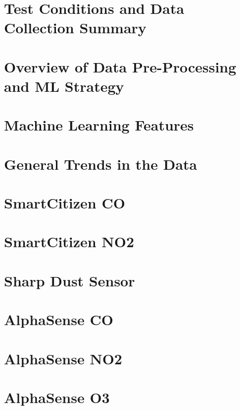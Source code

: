 \section{Test Conditions and Data Collection Summary}
 
\FloatBarrier

\section{Overview of Data Pre-Processing and ML Strategy}

\FloatBarrier

\section{Machine Learning Features}

\FloatBarrier

\section{General Trends in the Data}

\FloatBarrier

\section{SmartCitizen CO}

\FloatBarrier

\section{SmartCitizen NO2}

\FloatBarrier

\section{Sharp Dust Sensor}

\FloatBarrier

\section{AlphaSense CO}

\FloatBarrier

\section{AlphaSense NO2}

\FloatBarrier

\section{AlphaSense O3}

\FloatBarrier

